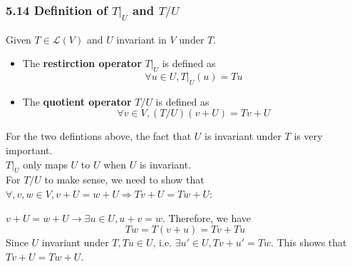 \documentclass{article}
\begin{document}
\subsubsection*{5.14 Definition of $T|_{U}$ and $T/U$}
Given $T \in \mathcal{L}(V)$ and $U$ invariant in $V$ under $T$.
\begin{itemize}
    \item The \textbf{restirction operator} $T|_{U}$ is defined as
    \begin{equation*}
        \forall u \in U, T|_{U}(u) = Tu
    \end{equation*}
    \item The \textbf{quotient operator} $T/U$ is defined as
    \begin{equation*}
        \forall v \in V, (T/U)(v+U) = Tv + U
    \end{equation*}
\end{itemize}
For the two defintions above, the fact that $U$ is invariant under $T$ is very important.\\
$T|_{U}$ only maps $U$ to $U$ when $U$ is invariant.\\
For $T/U$ to make sense, we need to show that $\forall, v, w \in V, v+U = w+U \Rightarrow Tv+U = Tw+U$:
\begin{addmargin}[1em]{0em}
    $v+U = w+U \rightarrow \exists u \in U, u+v = w$. Therefore, we have
    \begin{equation*}
        Tw = T(v+u) = Tv + Tu
    \end{equation*}
    Since $U$ invariant under $T, Tu \in U$, i.e. $\exists u' \in U, Tv + u' = Tw$. This shows that $Tv + U = Tw + U$.
\end{addmargin}
\end{document}
